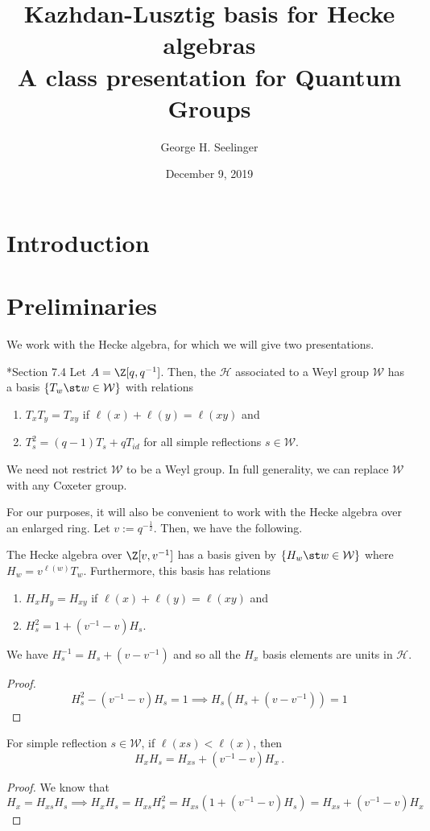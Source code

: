 \documentclass[11pt,leqno,oneside]{amsart}
\title[Kazhdan-Lusztig Basis]{Kazhdan-Lusztig basis for Hecke algebras
  \\ A class presentation for Quantum Groups}
\author{George H. Seelinger}
\date{December 9, 2019}
\numberwithin{thm}{section}
\renewcommand{\W}{\mathcal{W}}
\renewcommand{\H}{\mathcal{H}} %
\begin{document}
\maketitle
\section{Introduction}

\section{Preliminaries}
We work with the Hecke algebra, for which we will give two
presentations.
\begin{defn}
  \cite{humphreys}*{Section 7.4} Let \(A = \Z[q,q^{-1}]\). Then, the
   \(\H\) associated to 
  a Weyl group \(\W\) has a basis \(\{T_w \st w \in \W\}\) with
  relations
  \begin{enumerate}
  \item \(T_x T_y = T_{xy}\) if \(\ell(x) + \ell(y) = \ell(xy)\) and
  \item \(T_s^2 = (q-1)T_s + qT_{id}\) for all simple reflections \(s
    \in \W\).
  \end{enumerate}
\end{defn}
\begin{rmk}
  We need not restrict \(\W\) to be a Weyl group. In full generality,
  we can replace \(\W\) with any Coxeter group.
\end{rmk}
For our purposes, it will also be convenient to work with the Hecke
algebra over an enlarged ring. Let \(v := q^{-\frac{1}{2}}\). Then, we
have the following.
\begin{prop}\label{H-basis}
  The Hecke algebra over \(\Z[v,v^{-1}]\) has a basis given by \(\{H_w
  \st w \in \W\}\) where \(H_w = v^{\ell(w)} T_w\). Furthermore, this
  basis has relations
  \begin{enumerate}
  \item \(H_x H_y = H_{xy}\) if \(\ell(x)+\ell(y) = \ell(xy)\) and
  \item \(H_s^2 = 1 + (v^{-1}-v)H_s\). 
  \end{enumerate}
\end{prop}
\begin{lem}
  We have \(H_s^{-1} = H_s + (v-v^{-1})\) and so all the \(H_x\) basis
  elements are units in \(\H\).
\end{lem}
\begin{proof}
  \[
    H_s^2-(v^{-1}-v)H_s = 1 \implies H_s(H_s+(v-v^{-1})) = 1 
  \]
\end{proof}
\begin{lem}\label{lem:length-lowering-mult}
  For simple reflection \(s \in \W\), if \(\ell(xs) < \ell(x)\),
  then \[
    H_x H_s = H_{xs} + (v^{-1}-v)H_x \,. 
  \]
\end{lem}
\begin{proof}
  We know that \[
    H_x = H_{xs} H_s \implies H_x H_s = H_{xs} H_s^2 =
    H_{xs}(1+(v^{-1}-v)H_s) = H_{xs} + (v^{-1}-v)H_x
  \]
\end{proof}
\end{document}
